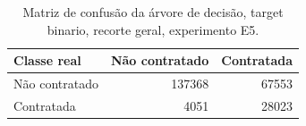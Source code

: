 \begin{table}
\caption{Matriz de confusão da árvore de decisão, target binario, recorte geral, experimento E5.}
\label{tab:matriz_confusao_treeClassification_14_profundidade_binario_recorte_geral_holdout_80_20_e5}
\begin{tabular}{lrr}
\toprule
Classe real & Não contratado & Contratada \\
\midrule
Não contratado & 137368 & 67553 \\
Contratada & 4051 & 28023 \\
\bottomrule
\end{tabular}
\end{table}
